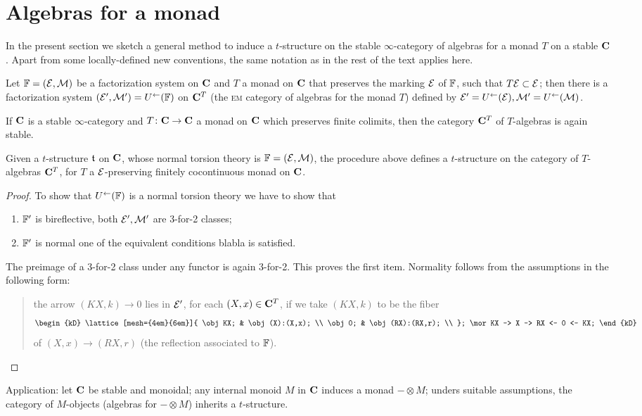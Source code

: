 \section{Algebras for a monad}
In the present section we sketch a general method to induce a $t$\hyp{}structure on the stable $\infty$\hyp{}category of algebras for a monad $T$ on a stable $\mathbf{C}$. Apart from some locally\hyp{}defined new conventions, the same notation as in the rest of the text applies here. 
\begin{lemma}
Let $\mathbb{F}=(\mathcal{E},\mathcal{M})$ be a factorization system on $\mathbf{C}$ and $T$ a monad on $\mathbf{C}$ that preserves the marking $\mathcal{E}$ of $\mathbb{F}$, \ie such that $T\mathcal{E}\subset \mathcal{E}$; then there is a factorization system $(\mathcal{E}',\mathcal{M}')=U^\leftarrow(\mathbb{F})$ on $\mathbf{C}^T$ (the \textsc{em} category of algebras for the monad $T$) defined by $\mathcal{E}' = U^\leftarrow(\mathcal{E}), \mathcal{M}' = U^\leftarrow(\mathcal{M})$.
\end{lemma}
\begin{proposition}
If $\mathbf{C}$ is a stable $\infty$\hyp{}category and $T\colon \mathbf{C}\to \mathbf{C}$ a monad on $\mathbf{C}$ which preserves finite colimits, then the category $\mathbf{C}^T$ of $T$\hyp{}algebras is again stable.
\end{proposition}
\begin{proposition}
Given a $t$\hyp{}structure $\mathfrak{t}$ on $\mathbf{C}$, whose normal torsion theory is $\mathbb{F}=(\mathcal{E},\mathcal{M})$, the procedure above defines a $t$\hyp{}structure on the category of $T$\hyp{}algebras $\mathbf{C}^T$, for $T$ a $\mathcal{E}$\hyp{}preserving finitely cocontinuous monad on $\mathbf{C}$.
\end{proposition}
\begin{proof}
To show that $U^\leftarrow(\mathbb{F})$ is a normal torsion theory we have to show that
\begin{enumerate}
\item $\mathbb{F}'$ is bireflective, \ie both $\mathcal{E}',\mathcal{M}'$ are 3\hyp{}for\hyp{}2 classes;
\item $\mathbb{F}'$ is normal \ie one of the equivalent conditions blabla is satisfied.
\end{enumerate}
The preimage of a 3\hyp{}for\hyp{}2 class under any functor is again 3\hyp{}for\hyp{}2. This proves the first item. Normality follows from the assumptions in the following form:
\begin{quote}
the arrow $(KX,k)\to 0$ lies in $\mathcal{E}'$, for each $(X,x)\in \mathbf{C}^T$, if we take $(KX, k)$ to be the fiber 
\[
\begin{kD}
\lattice[mesh={4em}{6em}]{
	\obj KX; & \obj (X):(X,x); \\
	\obj 0; & \obj (RX):(RX,r); \\
};
\mor KX -> X -> RX <- 0 <- KX;
\end{kD}
\]
of $(X,x)\to (RX,r)$ (the reflection associated to $\mathbb{F}$).\qedhere
\end{quote}
\end{proof}
Application: let $\mathbf{C}$ be stable and monoidal; any internal monoid $M$ in $\mathbf{C}$ induces a monad $-\otimes M$; unders suitable assumptions, the category of $M$\hyp{}objects (algebras for $-\otimes M$) inherits a $t$\hyp{}structure.